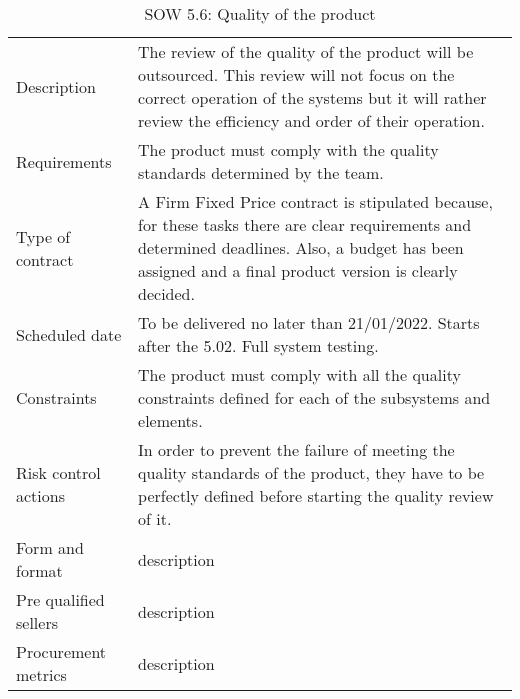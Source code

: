 \begin{table}[H]
	\centering
	\begin{tabular}
		{>{\raggedright\arraybackslash}p{3cm} >{\arraybackslash}p{11cm}}
		
		\toprule[2pt]
		
		\multicolumn{2}{c}{\textbf{SOW - 5.6. Quality of the product}}\\
		
		\midrule[1.5pt]
		
		Description & The review of the quality of the product will be outsourced. This review will not focus on the correct operation of the systems but it will rather review the efficiency and order of their operation. \\
		\hline
		
		Requirements & The product must comply with the quality standards determined by the team.\\
		\hline
		
		Type of contract & A Firm Fixed Price contract is stipulated because, for these tasks there are clear requirements and determined deadlines. Also, a budget has been assigned and a final product version is clearly decided.\\
		\hline
		
		Scheduled date & To be delivered no later than 21/01/2022. Starts after the 5.02. Full system testing.\\
		\hline
		
		Constraints & The product must comply with all the quality constraints defined for each of the subsystems and elements.\\
		\hline
		
		Risk control actions & In order to prevent the failure of meeting the quality standards of the product, they have to be perfectly defined before starting the quality review of it.\\
		\hline
		
		Form and format & description\\
		\hline
		
		Pre qualified sellers & description\\
		\hline
		
		Procurement metrics & description\\
		
		\bottomrule[2pt]		
		
	\end{tabular}
	\caption{SOW 5.6: Quality of the product}
\end{table}

